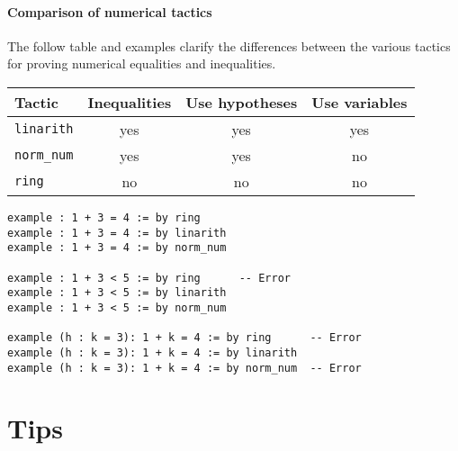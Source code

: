 \paragraph{Comparison of numerical tactics} The follow table and examples clarify the differences between the various tactics for proving numerical equalities and inequalities.
\begin{center}
\begin{tabular}{l|c|c|c}
\hline
Tactic & Inequalities & Use hypotheses & Use variables\\\hline
\Verb+linarith+ &yes& yes & yes\\
\Verb+norm_num+ & yes &yes & no\\
\Verb+ring+ & no & no & no \\
\end{tabular}
\end{center}

\begin{Verbatim}[numbers=none]
example : 1 + 3 = 4 := by ring
example : 1 + 3 = 4 := by linarith
example : 1 + 3 = 4 := by norm_num

example : 1 + 3 < 5 := by ring      -- Error
example : 1 + 3 < 5 := by linarith
example : 1 + 3 < 5 := by norm_num

example (h : k = 3): 1 + k = 4 := by ring      -- Error
example (h : k = 3): 1 + k = 4 := by linarith
example (h : k = 3): 1 + k = 4 := by norm_num  -- Error
\end{Verbatim}

\newpage

\section{Tips}

